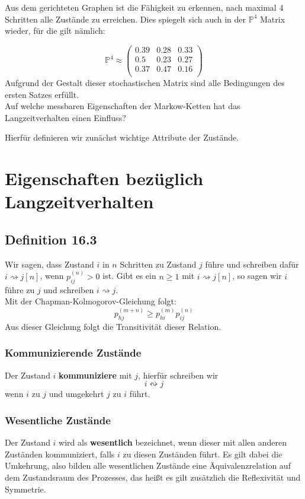 \documentclass[a4paper]{article}
\begin{document}
Aus dem gerichteten Graphen ist die Fähigkeit zu erkennen, nach maximal 4 Schritten alle Zustände
zu erreichen.
Dies spiegelt sich auch in der $\mathbb{P} ^{4}$ Matrix wieder, für die gilt nämlich:

\[
	\mathbb{P} ^{4} \approx \begin{pmatrix} 
		0.39 & 0.28 & 0.33 \\
		0.5 & 0.23 & 0.27 \\
		0.37 & 0.47 & 0.16 \\
	\end{pmatrix} 
\]
Aufgrund der Gestalt dieser stochastischen Matrix sind alle Bedingungen des ersten Satzes erfüllt.
\\

Auf welche messbaren Eigenschaften der Markow-Ketten hat das Langzeitverhalten einen Einfluss?

Hierfür definieren wir zunächst wichtige Attribute der Zustände.

\section{Eigenschaften bezüglich Langzeitverhalten}

\subsection{Definition 16.3}

Wir sagen, dass Zustand $i$ in $n$ Schritten zu Zustand $j$ führe und schreiben
dafür $i \rightsquigarrow j [n] $, wenn $p_{ij} ^{(n)} > 0$ ist.
Gibt es ein $n \geq 1$ mit $i \rightsquigarrow j [n]$, so sagen wir $i$ führe
zu $j$ und schreiben $i \rightsquigarrow j$.
\\

Mit der Chapman-Kolmogorov-Gleichung folgt:
\[
p_{hj} ^{(m+n)} \geq p_{hi} ^{(m)} p_{ij} ^{(n)}
\] 
Aus dieser Gleichung folgt die Transitivität dieser Relation.

\subsubsection{Kommunizierende Zustände}

Der Zustand $i$ \textbf{kommuniziere}  mit $j$, hierfür schreiben wir
\[
i \leftrightsquigarrow j
\] 
wenn $i$ zu $j$ und umgekehrt $j$ zu $i$
führt.

\subsubsection{Wesentliche Zustände}
Der Zustand $i$ wird als \textbf{wesentlich}  bezeichnet, wenn dieser mit allen anderen Zuständen
kommuniziert, falls $i$ zu diesen Zuständen führt. Es gilt dabei die Umkehrung, also bilden alle
wesentlichen Zustände eine Äquivalenzrelation auf dem Zustandsraum des Prozesses, das heißt es
gilt zusätzlich die Reflexivität und Symmetrie.
\end{document}
